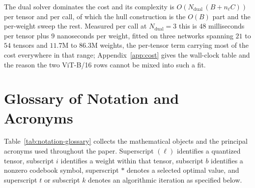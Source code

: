 \documentclass{article}
\begin{document}
The dual solver dominates the cost and its complexity is
$O\!\left(N_{\mathrm{dual}}\,(B + n_\ell C)\right)$ per tensor and per call, of
which the hull construction is the $O(B)$ part and the per-weight sweep the rest.
Measured per call at $N_{\mathrm{dual}}=3$ this is $48$ milliseconds per tensor
plus $9$ nanoseconds per weight, fitted on three networks spanning $21$ to $54$
tensors and $11.7$M to $86.3$M weights, the per-tensor term carrying most of the
cost everywhere in that range; Appendix~\ref{app:cost} gives the wall-clock table
and the reason the two ViT-B/16 rows cannot be mixed into such a fit.

\section{Glossary of Notation and Acronyms}
\label{app:notation}
\label{app:glossary}

Table~\ref{tab:notation-glossary} collects the mathematical objects and the
principal acronyms used throughout the paper. Superscript $(\ell)$ identifies
a quantized tensor, subscript $i$ identifies a weight within that tensor,
subscript $b$ identifies a nonzero codebook symbol, superscript $*$ denotes a
selected optimal value, and superscript $t$ or subscript $k$ denotes an
algorithmic iteration as specified below.
\end{document}
